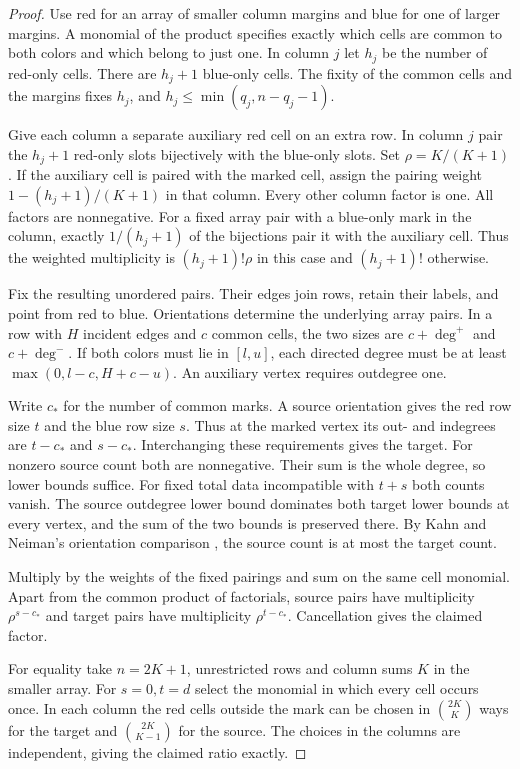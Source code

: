 \documentclass[11pt]{article}
\begin{document}
\begin{proof}
Use red for an array of smaller column margins and blue for one of larger margins. A monomial of the product specifies exactly which cells are common to both colors and which belong to just one. In column $j$ let $h_j$ be the number of red-only cells. There are $h_j+1$ blue-only cells. The fixity of the common cells and the margins fixes $h_j$, and $h_j\le \min(q_j,n-q_j-1)$.

Give each column a separate auxiliary red cell on an extra row. In column $j$ pair the $h_j+1$ red-only slots bijectively with the blue-only slots. Set $\rho=K/(K+1)$. If the auxiliary cell is paired with the marked cell, assign the pairing weight $1-(h_j+1)/(K+1)$ in that column. Every other column factor is one. All factors are nonnegative. For a fixed array pair with a blue-only mark in the column, exactly $1/(h_j+1)$ of the bijections pair it with the auxiliary cell. Thus the weighted multiplicity is $(h_j+1)!\rho$ in this case and $(h_j+1)!$ otherwise.

Fix the resulting unordered pairs. Their edges join rows, retain their labels, and point from red to blue. Orientations determine the underlying array pairs. In a row with $H$ incident edges and $c$ common cells, the two sizes are $c+\deg^+$ and $c+\deg^-$. If both colors must lie in $[l,u]$, each directed degree must be at least $\max(0,l-c,H+c-u)$. An auxiliary vertex requires outdegree one.

Write $c_*$ for the number of common marks. A source orientation gives the red row size $t$ and the blue row size $s$. Thus at the marked vertex its out- and indegrees are $t-c_*$ and $s-c_*$. Interchanging these requirements gives the target. For nonzero source count both are nonnegative. Their sum is the whole degree, so lower bounds suffice. For fixed total data incompatible with $t+s$ both counts vanish. The source outdegree lower bound dominates both target lower bounds at every vertex, and the sum of the two bounds is preserved there. By Kahn and Neiman's orientation comparison \cite[Lemma 8]{kn}, the source count is at most the target count.

Multiply by the weights of the fixed pairings and sum on the same cell monomial. Apart from the common product of factorials, source pairs have multiplicity $\rho^{s-c_*}$ and target pairs have multiplicity $\rho^{t-c_*}$. Cancellation gives the claimed factor.

For equality take $n=2K+1$, unrestricted rows and column sums $K$ in the smaller array. For $s=0,t=d$ select the monomial in which every cell occurs once. In each column the red cells outside the mark can be chosen in $\binom{2K}{K}$ ways for the target and $\binom{2K}{K-1}$ for the source. The choices in the columns are independent, giving the claimed ratio exactly.
\end{proof}
\end{document}
